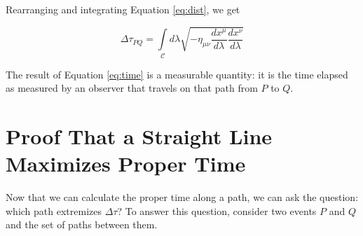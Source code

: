 \documentclass[11pt]{article}
\begin{document}
Rearranging and integrating Equation \ref{eq:dist}, we get

\begin{equation}\label{eq:time}
  \Delta\tau_{PQ} = \int\limits_{\mathcal{C}} d\lambda \sqrt{-\eta_{\mu\nu}\frac{dx^\mu}{d\lambda}\frac{dx^\nu}{d\lambda}}
\end{equation}

The result of Equation \ref{eq:time} is a measurable quantity: it is the time elapsed as measured by an observer that travels on that path from $P$ to $Q$.

\section{Proof That a Straight Line Maximizes Proper Time}

Now that we can calculate the proper time along a path, we can ask the question: which path extremizes $\Delta\tau$? To answer this question, consider two events $P$ and $Q$ and the set of paths between them.
\end{document}
